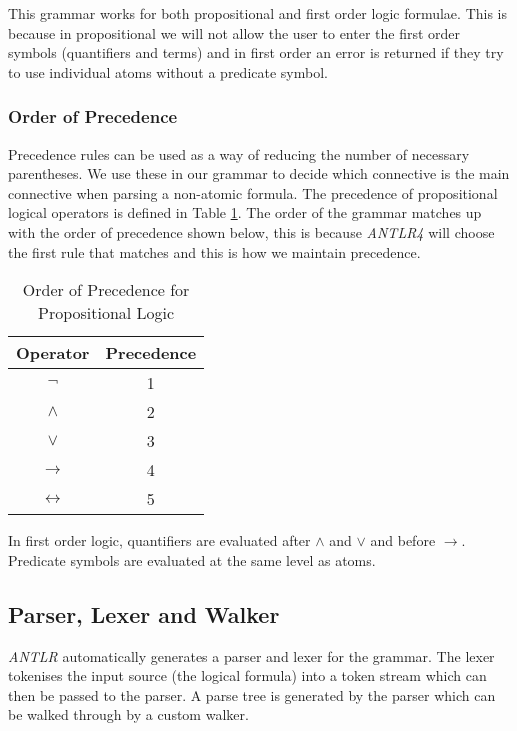 \documentclass{report}
\begin{document}
This grammar works for both propositional and first order logic formulae. This is because in propositional we will not allow the user to enter the first order symbols (quantifiers and terms) and in first order an error is returned if they try to use individual atoms without a predicate symbol.

\subsubsection{Order of Precedence}

Precedence rules can be used as a way of reducing the number of necessary parentheses. We use these in our grammar to decide which connective is the main connective when parsing a non-atomic formula. The precedence of propositional logical operators is defined in Table \ref{orderofprecendence}. The order of the grammar matches up with the order of precedence shown below, this is because \emph{ANTLR4} will choose the first rule that matches and this is how we maintain precedence.

\begin{table}[h]
\begin{center}
\begin{tabular}{| c | c |}
    \hline
    Operator & Precedence \\ \hline 
    $\lnot$  & 1 \\
    $\land$  & 2 \\
    $\lor$   & 3 \\
    $\to$    & 4 \\
    $\leftrightarrow$ & 5 \\ \hline
\end{tabular}
\caption{Order of Precedence for Propositional Logic}
\label{orderofprecendence}
\end{center}
\end{table}

In first order logic, quantifiers are evaluated after $\land$ and $\lor$ and before $\rightarrow$. Predicate symbols are evaluated at the same level as atoms.

\subsection{Parser, Lexer and Walker}
\label{sub:walker}

\emph{ANTLR} automatically generates a parser and lexer for the grammar. The lexer tokenises the input source (the logical formula) into a token stream which can then be passed to the parser. A parse tree is generated by the parser which can be walked through by a custom walker. 
\end{document}
